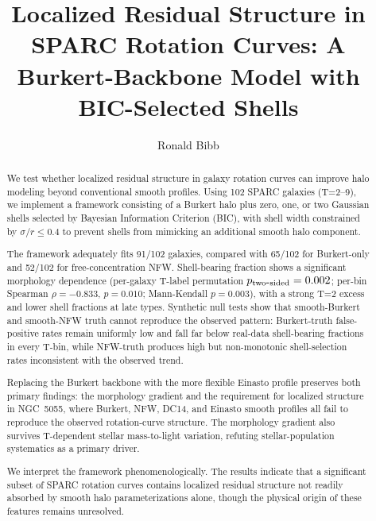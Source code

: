 
\title{Localized Residual Structure in SPARC Rotation Curves: A Burkert-Backbone Model with BIC-Selected Shells}

\author{Ronald Bibb}

\begin{abstract}
We test whether localized residual structure in galaxy rotation curves can improve halo modeling beyond conventional smooth profiles. Using 102 SPARC galaxies (T=2--9), we implement a framework consisting of a Burkert halo plus zero, one, or two Gaussian shells selected by Bayesian Information Criterion (BIC), with shell width constrained by $\sigma/r \leq 0.4$ to prevent shells from mimicking an additional smooth halo component.

The framework adequately fits 91/102 galaxies, compared with 65/102 for Burkert-only and 52/102 for free-concentration NFW. Shell-bearing fraction shows a significant morphology dependence (per-galaxy T-label permutation $p_{\rm two\mbox{-}sided}=0.002$; per-bin Spearman $\rho=-0.833$, $p=0.010$; Mann-Kendall $p=0.003$), with a strong T=2 excess and lower shell fractions at late types. Synthetic null tests show that smooth-Burkert and smooth-NFW truth cannot reproduce the observed pattern: Burkert-truth false-positive rates remain uniformly low and fall far below real-data shell-bearing fractions in every T-bin, while NFW-truth produces high but non-monotonic shell-selection rates inconsistent with the observed trend.

Replacing the Burkert backbone with the more flexible Einasto profile preserves both primary findings: the morphology gradient and the requirement for localized structure in NGC~5055, where Burkert, NFW, DC14, and Einasto smooth profiles all fail to reproduce the observed rotation-curve structure. The morphology gradient also survives T-dependent stellar mass-to-light variation, refuting stellar-population systematics as a primary driver.

We interpret the framework phenomenologically. The results indicate that a significant subset of SPARC rotation curves contains localized residual structure not readily absorbed by smooth halo parameterizations alone, though the physical origin of these features remains unresolved.
\end{abstract}

